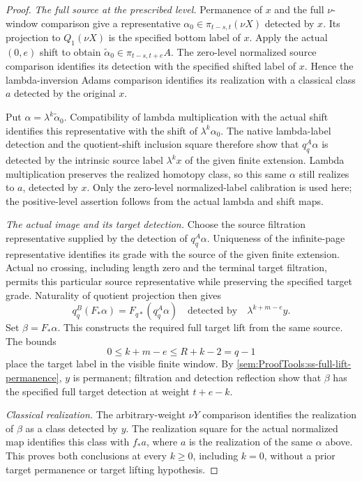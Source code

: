 \begin{proof}
\textit{The full source at the prescribed level.}
Permanence of $x$ and the full $\nu$-window comparison give a
representative $\alpha_0\in\pi_{t-s,t}(\nu X)$ detected by $x$.
Its projection to $Q_1(\nu X)$ is the specified bottom label of
$x$. Apply the actual $(0,e)$ shift to obtain
$\widetilde\alpha_0\in\pi_{t-s,t+e}A$. The zero-level normalized
source comparison identifies its detection with the specified
shifted label of $x$. Hence the lambda-inversion Adams comparison
identifies its realization with a classical class $a$ detected
by the original $x$.

Put $\alpha=\lambda^k\widetilde\alpha_0$. Compatibility of
lambda multiplication with the actual shift identifies this
representative with the shift of $\lambda^k\alpha_0$. The native
lambda-label detection and the quotient-shift inclusion square
therefore show that $q_q^A\alpha$ is detected by the intrinsic
source label $\lambda^kx$ of the given finite extension.
Lambda multiplication preserves the realized homotopy class,
so this same $\alpha$ still realizes to $a$, detected by $x$.
Only the zero-level normalized-label calibration is used here;
the positive-level assertion follows from the actual lambda and
shift maps.

\textit{The actual image and its target detection.}
Choose the source filtration representative supplied by the
detection of $q_q^A\alpha$. Uniqueness of the infinite-page
representative identifies its grade with the source of the given
finite extension. Actual no crossing, including length zero and
the terminal target filtration, permits this particular source
representative while preserving the specified target grade.
Naturality of quotient projection then gives
\[
q_q^B(F_*\alpha)=F_{q*}(q_q^A\alpha)
\quad\text{detected by}\quad \lambda^{k+m-e}y.
\]
Set $\beta=F_*\alpha$. This constructs the required full target
lift from the same source. The bounds
\[
0\le k+m-e\le R+k-2=q-1
\]
place the target label in the visible finite window. By
\ref{sem:ProofTools:ss-full-lift-permanence}, $y$ is permanent;
filtration and detection reflection show that $\beta$ has the
specified full target detection at weight $t+e-k$.

\textit{Classical realization.}
The arbitrary-weight $\nu Y$ comparison identifies the realization
of $\beta$ as a class detected by $y$. The realization square for
the actual normalized map identifies this class with $f_*a$,
where $a$ is the realization of the same $\alpha$ above.
This proves both conclusions at every $k\ge0$, including $k=0$,
without a prior target permanence or target lifting hypothesis.
\end{proof}

